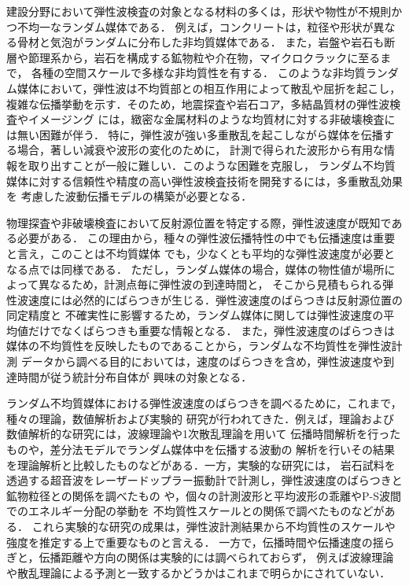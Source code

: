 建設分野において弾性波検査の対象となる材料の多くは，形状や物性が不規則かつ不均一なランダム媒体である．
例えば，コンクリートは，粒径や形状が異なる骨材と気泡がランダムに分布した非均質媒体である．
また，岩盤や岩石も断層や節理系から，岩石を構成する鉱物粒や介在物，マイクロクラックに至るまで，
各種の空間スケールで多様な非均質性を有する\cite{RockPhys}．
このような非均質ランダム媒体において，弾性波は不均質部との相互作用によって散乱や屈折を起こし，
複雑な伝播挙動を示す．そのため，地震探査や岩石コア，多結晶質材の弾性波検査やイメージング
には，緻密な金属材料のような均質材に対する非破壊検査には無い困難が伴う\cite{Sato,Borcea,Thompson}．
特に，弾性波が強い多重散乱を起こしながら媒体を伝播する場合，著しい減衰や波形の変化のために，
計測で得られた波形から有用な情報を取り出すことが一般に難しい．このような困難を克服し，
ランダム不均質媒体に対する信頼性や精度の高い弾性波検査技術を開発するには，多重散乱効果を
考慮した波動伝播モデルの構築が必要となる．

物理探査や非破壊検査において反射源位置を特定する際，弾性波速度が既知である必要がある\cite{Etgen, Schmitz}．
この理由から，種々の弾性波伝播特性の中でも伝播速度は重要と言え，このことは不均質媒体
でも，少なくとも平均的な弾性波速度が必要となる点では同様である\cite{Langenberg, Bleistein}．
ただし，ランダム媒体の場合，媒体の物性値が場所によって異なるため，計測点毎に弾性波の到達時間と，
そこから見積もられる弾性波速度には必然的にばらつきが生じる．弾性波速度のばらつきは反射源位置の同定精度と
不確実性に影響するため，ランダム媒体に関しては弾性波速度の平均値だけでなくばらつきも重要な情報となる．
また，弾性波速度のばらつきは媒体の不均質性を反映したものであることから，ランダムな不均質性を弾性波計測
データから調べる目的においては，速度のばらつきを含め，弾性波速度や到達時間が従う統計分布自体が
興味の対象となる\cite{Yu,Li}．

ランダム不均質媒体における弾性波速度のばらつきを調べるために，これまで，種々の理論，数値解析および実験的
研究が行われてきた\cite{NishizawaI}．例えば，理論および数値解析的な研究には，波線理論や1次散乱理論を用いて
伝播時間解析を行ったもの\cite{Muller, Korn, Spetzler2001}や，差分法モデルでランダム媒体中を伝播する波動の
解析を行いその結果を理論解析と比較したもの\cite{Spetzler}などがある．一方，実験的な研究には，
岩石試料を透過する超音波をレーザードップラー振動計で計測し，弾性波速度のばらつきと鉱物粒径との関係を調べたもの
\cite{Nishizawa1996,Nishizawa2001}や，個々の計測波形と平均波形の乖離やP-S波間でのエネルギー分配の挙動を
不均質性スケールとの関係で調べたものなど\cite{Sivaji,Fukushima}がある．
これら実験的な研究の成果は，弾性波計測結果から不均質性のスケールや強度を推定する上で重要なものと言える．
一方で，伝播時間や伝播速度の揺らぎと，伝播距離や方向の関係は実験的には調べられておらず，
例えば波線理論や散乱理論による予測と一致するかどうかはこれまで明らかにされていない．

